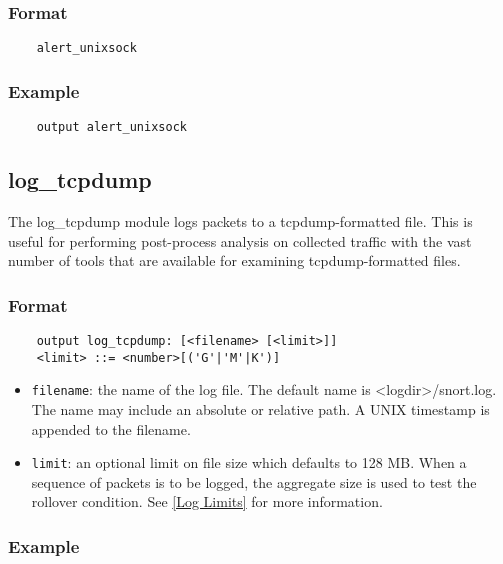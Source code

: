 \documentclass[english]{report}
\begin{document}
\subsubsection{Format}

\begin{verbatim}
    alert_unixsock
\end{verbatim}

\subsubsection{Example}

\begin{verbatim}
    output alert_unixsock
\end{verbatim}

\subsection{log\_tcpdump}

The log\_tcpdump module logs packets to a tcpdump-formatted file.  This is
useful for performing post-process analysis on collected traffic with the vast
number of tools that are available for examining tcpdump-formatted files.

\subsubsection{Format}

\begin{verbatim}
    output log_tcpdump: [<filename> [<limit>]]
    <limit> ::= <number>[('G'|'M'|K')]
\end{verbatim}

\begin{itemize}
\item \texttt{filename}: the name of the log file.  The default name is
<logdir>/snort.log.  The name may include an absolute or relative path.  A
UNIX timestamp is appended to the filename.

\item \texttt{limit}: an optional limit on file size which defaults to 128 MB.
When a sequence of packets is to be logged, the aggregate size is used to test
the rollover condition.  See \ref{Log Limits} for more information.
\end{itemize}

\subsubsection{Example}
\end{document}
